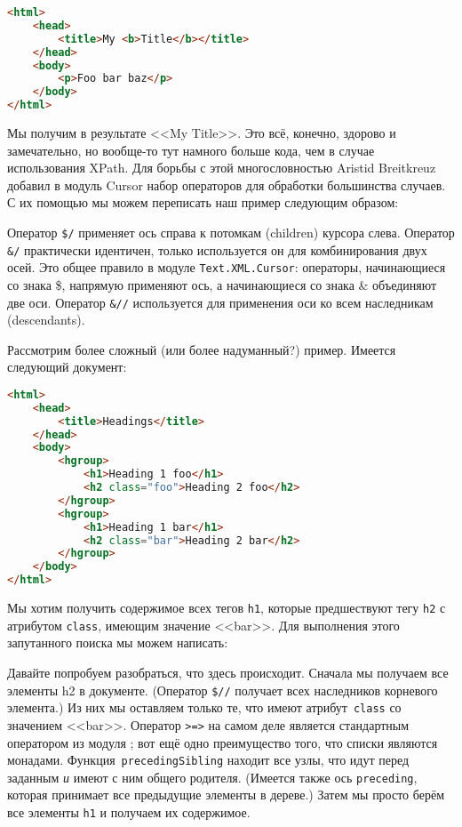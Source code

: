 \begin{lstlisting}[language=HTML]
<html>
    <head>
        <title>My <b>Title</b></title>
    </head>
    <body>
        <p>Foo bar baz</p>
    </body>
</html>
\end{lstlisting}

Мы получим в результате <<My Title>>. Это всё, конечно, здорово и замечательно, но вообще-то тут намного больше кода, чем в случае использования XPath. Для борьбы с этой многословностью Aristid Breitkreuz добавил в модуль Cursor набор операторов для обработки большинства случаев. С их помощью мы можем переписать наш пример следующим образом:


Оператор \lstinline!$/! применяет ось справа к потомкам (children) курсора слева. Оператор \lstinline!&/! практически идентичен, только используется он для комбинирования двух осей. Это общее правило в модуле \lstinline!Text.XML.Cursor!: операторы, начинающиеся со знака \$, напрямую применяют ось, а начинающиеся со знака \& объединяют две оси. Оператор \lstinline!&//! используется для применения оси ко всем наследникам (descendants).

Рассмотрим более сложный (или более надуманный?) пример. Имеется следующий документ:

\begin{lstlisting}[language=HTML]
<html>
    <head>
        <title>Headings</title>
    </head>
    <body>
        <hgroup>
            <h1>Heading 1 foo</h1>
            <h2 class="foo">Heading 2 foo</h2>
        </hgroup>
        <hgroup>
            <h1>Heading 1 bar</h1>
            <h2 class="bar">Heading 2 bar</h2>
        </hgroup>
    </body>
</html>
\end{lstlisting}

Мы хотим получить содержимое всех тегов \lstinline!h1!, которые предшествуют тегу \lstinline!h2! с атрибутом \lstinline!class!, имеющим значение <<bar>>. Для выполнения этого запутанного поиска мы можем написать:


Давайте попробуем разобраться, что здесь происходит. Сначала мы получаем все элементы h2 в документе. (Оператор \lstinline!$//! получает всех наследников корневого элемента.) Из них мы оставляем только те, что имеют атрибут~\lstinline!class! со значением <<bar>>. Оператор \lstinline!>=>! на самом деле является стандартным оператором из модуля ; вот ещё одно преимущество того, что списки являются монадами. Функция~\lstinline!precedingSibling! находит все узлы, что идут перед заданным \emph{и} имеют с ним общего родителя. (Имеется также ось \lstinline!preceding!, которая принимает все предыдущие элементы в дереве.) Затем мы просто берём все элементы \lstinline!h1! и получаем их содержимое.


